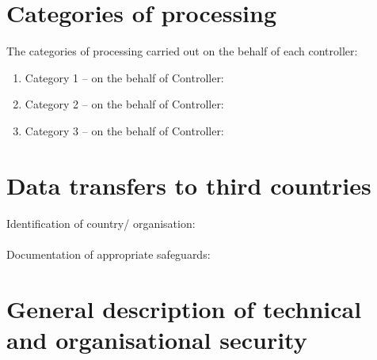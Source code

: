 \documentclass[11pt]{article}
\begin{document}
\section{Categories of processing}
The categories of processing carried out on the behalf of each controller:\\
\begin{enumerate}
  \item Category 1 -- on the behalf of Controller:
  \item Category 2 -- on the behalf of Controller:
  \item Category 3 -- on the behalf of Controller:
\end{enumerate}

\section{Data transfers to third countries}
Identification of country/ organisation:\\
\\
Documentation of appropriate safeguards:\\
\section{General description of technical and organisational security}
\end{document}
